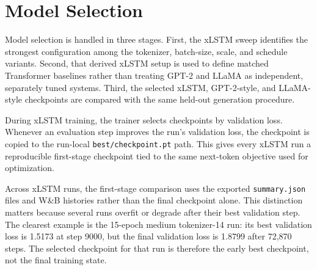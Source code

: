 \section{Model Selection}

Model selection is handled in three stages. First, the xLSTM sweep identifies the strongest configuration among the tokenizer, batch-size, scale, and schedule variants. Second, that derived xLSTM setup is used to define matched Transformer baselines rather than treating GPT-2 and LLaMA as independent, separately tuned systems. Third, the selected xLSTM, GPT-2-style, and LLaMA-style checkpoints are compared with the same held-out generation procedure.

During xLSTM training, the trainer selects checkpoints by validation loss. Whenever an evaluation step improves the run's validation loss, the checkpoint is copied to the run-local \verb|best/checkpoint.pt| path. This gives every xLSTM run a reproducible first-stage checkpoint tied to the same next-token objective used for optimization.

Across xLSTM runs, the first-stage comparison uses the exported \verb|summary.json| files and W\&B histories rather than the final checkpoint alone. This distinction matters because several runs overfit or degrade after their best validation step. The clearest example is the 15-epoch medium tokenizer-14 run: its best validation loss is 1.5173 at step 9000, but the final validation loss is 1.8799 after 72,870 steps. The selected checkpoint for that run is therefore the early best checkpoint, not the final training state.


